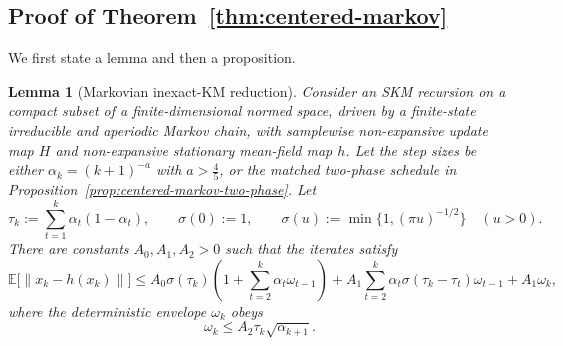 \documentclass{article}
\newtheorem{lemma}[theorem]{Lemma}
\newcommand{\E}{\mathbb{E}}
\begin{document}
\subsection{Proof of Theorem~\ref{thm:centered-markov}}
We first state a lemma and then a proposition.
\begin{lemma}[Markovian inexact-KM reduction]\label{lem:markov-inexact-km}
Consider an SKM recursion on a compact subset of a finite-dimensional normed space, driven by a finite-state irreducible and aperiodic Markov chain, with samplewise non-expansive update map $H$ and non-expansive stationary mean-field map $h$. Let the step sizes be either $\alpha_k=(k+1)^{-a}$ with $a>\frac45$, or the matched two-phase schedule in Proposition~\ref{prop:centered-markov-two-phase}. Let
\begin{equation}
\tau_k:=\sum_{t=1}^k \alpha_t(1-\alpha_t),\qquad \sigma(0):=1,\qquad \sigma(u):=\min\{1,(\pi u)^{-1/2}\}\quad (u>0).
\end{equation}
There are constants $A_0,A_1,A_2>0$ such that the iterates satisfy
\begin{equation}\label{eq:markov-inexact-km}
\E\bigl[\|x_k-h(x_k)\|\bigr] \le A_0\sigma(\tau_k)\left(1+\sum_{t=2}^k \alpha_t\omega_{t-1}\right) +A_1\sum_{t=2}^k \alpha_t\sigma(\tau_k-\tau_t)\omega_{t-1} +A_1\omega_k,
\end{equation}
where the deterministic envelope $\omega_k$ obeys
\begin{equation}\label{eq:markov-poisson-envelope}
\omega_k\le A_2\tau_k\sqrt{\alpha_{k+1}}.
\end{equation}
\end{lemma}
\end{document}
